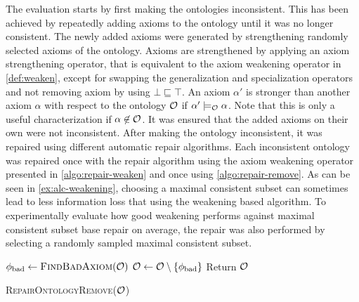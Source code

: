 The evaluation starts by first making the ontologies inconsistent. This has been achieved by repeatedly adding axioms to the ontology until it was no longer consistent. The newly added axioms were generated by strengthening randomly selected axioms of the ontology. Axioms are strengthened by applying an axiom strengthening operator, that is equivalent to the axiom weakening operator in \cref{def:weaken}, except for swapping the generalization and specialization operators and not removing axiom by using $\bot \sqsubseteq \top$. An axiom $\alpha'$ is stronger than another axiom $\alpha$ with respect to the ontology $\mathcal{O}$ if $\alpha' \models_\mathcal{O} \alpha$. Note that this is only a useful characterization if $\alpha \not\in \mathcal{O}$. It was ensured that the added axioms on their own were not inconsistent. After making the ontology inconsistent, it was repaired using different automatic repair algorithms. Each inconsistent ontology was repaired once with the repair algorithm using the axiom weakening operator presented in \cref{algo:repair-weaken} and once using \cref{algo:repair-remove}. As can be seen in \cref{ex:alc-weakening}, choosing a maximal consistent subset can sometimes lead to less information loss that using the weakening based algorithm. To experimentally evaluate how good weakening performs against maximal consistent subset base repair on average, the repair was also performed by selecting a randomly sampled maximal consistent subset.

\begin{algorithm}[ht]
  \begin{algorithmic}
    \State $\phi_\textnormal{bad} \gets \textsc{FindBadAxiom}(\mathcal{O})$
    \State $\mathcal{O} \gets \mathcal{O} \setminus \{\phi_\textnormal{bad}\}$
    \EndWhile
    \State Return $\mathcal{O}$
  \end{algorithmic}
  \caption{\textsc{RepairOntologyRemove}($\mathcal{O}$)}
  \label{algo:repair-remove}
\end{algorithm}

